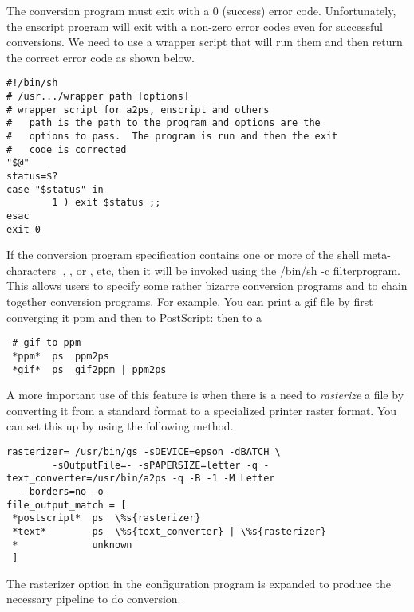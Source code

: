 \documentclass[a4paper]{article}
\begin{document}
The conversion program must exit with a 0 (success) error code.
Unfortunately,
the {\ttfamily enscript} program
will exit with a non-zero error codes even for successful conversions.
We need to use a
{\ttfamily wrapper} script that will run them and then return the correct
error code as shown below.
\begin{tscreen}
\begin{verbatim}
#!/bin/sh
# /usr.../wrapper path [options]
# wrapper script for a2ps, enscript and others
#   path is the path to the program and options are the
#   options to pass.  The program is run and then the exit
#   code is corrected
"$@"
status=$?
case "$status" in
        1 ) exit $status ;;
esac
exit 0
\end{verbatim}
\end{tscreen}


If the conversion program specification contains one or more of the
shell meta-characters
{\ttfamily $|$}, {\ttfamily {$<$}}, or {\ttfamily {$<$}}, etc,
then it will be invoked using the {\ttfamily /bin/sh -c filterprogram}.
This allows users to specify some rather bizarre conversion
programs and to chain together conversion programs.
For example,
You can print a {\ttfamily gif} file by first converging it {\ttfamily ppm} and then
to PostScript:
then to a 
\begin{tscreen}
\begin{verbatim}
 # gif to ppm
 *ppm*  ps  ppm2ps
 *gif*  ps  gif2ppm | ppm2ps
\end{verbatim}
\end{tscreen}


\label{rasterizer}
A more important use of this feature is when there is a need to
{\itshape rasterize\/} a file by converting it from a standard format to
a specialized printer raster format.
You can set this up by using the following method.
\begin{tscreen}
\begin{verbatim}
rasterizer= /usr/bin/gs -sDEVICE=epson -dBATCH \
        -sOutputFile=- -sPAPERSIZE=letter -q -
text_converter=/usr/bin/a2ps -q -B -1 -M Letter
  --borders=no -o- 
file_output_match = [
 *postscript*  ps  \%s{rasterizer}
 *text*        ps  \%s{text_converter} | \%s{rasterizer}
 *             unknown
 ]
\end{verbatim}
\end{tscreen}


The {\ttfamily rasterizer} option in the configuration program
is expanded to produce the necessary pipeline to do conversion.
\end{document}
